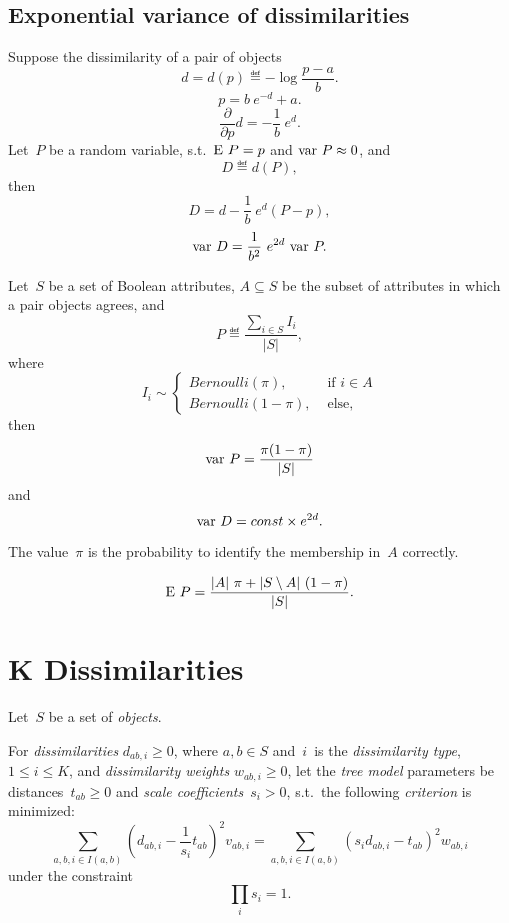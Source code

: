\documentclass[10pt,a4paper]{article}
\theoremstyle{plain} \newtheorem{Lem}{Lemma}
\begin{document}
\subsection{Exponential variance of dissimilarities}
\comm{}

Suppose the dissimilarity of a pair of objects
$$ d = d(p) \eqdef - \log \frac {p - a} b. $$
$$ p = b \ e^{-d} + a. $$
$$ \frac \partial {\partial p} d = - \frac 1 b \ e^d. $$
Let~$P$ be a random variable, s.t.~$\mathrm E \  P = p$ and $\mathrm {var} \  P \approx 0$,
and
$$D \eqdef d(P), $$
then
$$ D = d - \frac 1 b \ e^{d} (P - p), $$
$$ \mathrm {var} \  D = \frac 1 {b^2} \ e^{2 d} \ \mathrm {var} \  P. $$

Let~$S$ be a set of Boolean attributes,
$A \subseteq S$ be the subset of attributes in which a pair objects agrees,
and
$$ P \eqdef \frac {\sum_{i \in S} I_i} {|S|}, $$
where
$$ I_i \sim
    \begin{cases}
        Bernoulli(\pi),  &\text{ if } i \in A\\
        Bernoulli(1-\pi),  &\text{ else},
    \end{cases}
$$
then
$$ \mathrm {var} \  P = \frac {\pi (1 - \pi)} {|S|} $$
and
$$ \mathrm {var} \  D = const \times e^{2 d}. $$

The value~$\pi$ is the probability to identify the membership in~$A$ correctly.

$$ \mathrm E \  P = \frac {|A| \ \pi + |S \setminus A| \ (1 - \pi)} {|S|}. $$



\section{K Dissimilarities}


  Let~$S$ be a set of {\em objects}.

  For {\em dissimilarities} $d_{ab,i} \ge 0$,
  where $a, b \in S$ and~$i$~is the {\em dissimilarity type}, $1 \le i \le K$,
  and {\em dissimilarity weights} $w_{ab,i} \ge 0$,
  let the {\em tree model} parameters be distances~$t_{ab} \ge 0$ and {\em scale coefficients}~$s_i > 0$,
  s.t.~the following {\em criterion} is minimized:
  \begin{equation} \label{tree_model_criterion}
  \sum_{a,b,i \in I(a,b)} \left(d_{ab,i} - \frac 1 {s_i} t_{ab}\right)^2 v_{ab,i}
  = \sum_{a,b,i \in I(a,b)} \left(s_i d_{ab,i} - t_{ab}\right)^2 w_{ab,i}
  \end{equation}
  under the constraint
  \begin{equation} \label{scale_constraint}
  \prod_i s_i = 1.
  \end{equation}
\end{document}
